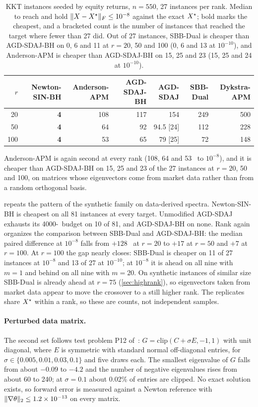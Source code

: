 \begin{table}[t]
\centering
\caption{KKT instances seeded by equity returns, $n=550$, 27 instances per
rank. Median \EVDs\ to reach and hold $\lVert X-X^\star\rVert_F\le10^{-8}$ against the exact
$X^\star$; bold marks the cheapest, and a bracketed count is the number of
instances that reached the target where fewer than 27 did. Out of 27
instances, SBB-Dual is cheaper than AGD-SDAJ-BH on 0, 6 and 11 at $r=20$, 50
and 100 (0, 6 and 13 at $10^{-10}$), and Anderson-APM is cheaper than
AGD-SDAJ-BH on 15, 25 and 23 (15, 25 and 24 at $10^{-10}$).}
\label{tab:thesiskkt}
\small
\setlength{\tabcolsep}{4pt}
\begin{tabular}{rrrrrrr}
\toprule
$r$ & Newton-SIN-BH & Anderson-APM & AGD-SDAJ-BH & AGD-SDAJ & SBB-Dual & Dykstra-APM\\
\midrule
20  & \textbf{4} & 108 & 117 & 154 & 249 & 500\\
50  & \textbf{4} & 64  & 92  & 94.5 [24] & 112 & 228\\
100 & \textbf{4} & 53  & 65  & 79 [25] & 72  & 148\\
\bottomrule
\end{tabular}
\end{table}

Anderson-APM is again second at every rank (108, 64 and 53 \EVDs\ to
$10^{-8}$), and it is cheaper than AGD-SDAJ-BH on 15, 25 and 23 of the 27
instances at $r=20$, 50 and 100, on matrices whose eigenvectors come from
market data rather than from a random orthogonal basis.

 repeats the pattern of the synthetic family on
data-derived spectra. Newton-SIN-BH is cheapest on all 81 instances at every
target. Unmodified AGD-SDAJ exhausts its 4000-\EVD\ budget on 10 of 81, and
AGD-SDAJ-BH on none. Rank again organizes the comparison between SBB-Dual and
AGD-SDAJ-BH: the median paired difference at $10^{-8}$ falls from $+128$ \EVDs\
at $r=20$ to $+17$ at $r=50$ and $+7$ at $r=100$. At $r=100$ the gap nearly
closes: SBB-Dual is cheaper on 11 of 27 instances at $10^{-8}$ and 13 of 27 at
$10^{-10}$; at $10^{-8}$ it is ahead on all nine with $m=1$ and behind on all
nine with $m=20$.
On synthetic instances of similar size SBB-Dual is already ahead at $r=75$
(\cref{sec:highrank}), so eigenvectors taken from market data appear to move
the crossover to a still higher rank. The replicates share $X^\star$ within a
rank, so these are counts, not independent samples.

\paragraph{Perturbed data matrix.}
The second set follows test problem P12 of~\cite{huynh2025accelerated}:
$G=\mathrm{clip}(C+\sigma E,-1,1)$ with unit diagonal, where $E$ is symmetric
with standard normal off-diagonal entries, for
$\sigma\in\{0.005,0.01,0.03,0.1\}$ and five draws each. The smallest
eigenvalue of $G$ falls from about $-0.09$ to $-4.2$ and the number of negative
eigenvalues rises from about 60 to 240; at $\sigma=0.1$ about 0.02\% of entries
are clipped. No exact solution exists, so forward error is measured against a
Newton reference with $\lVert \nabla\theta\rVert_2\le1.2\times10^{-13}$ on every
matrix.

